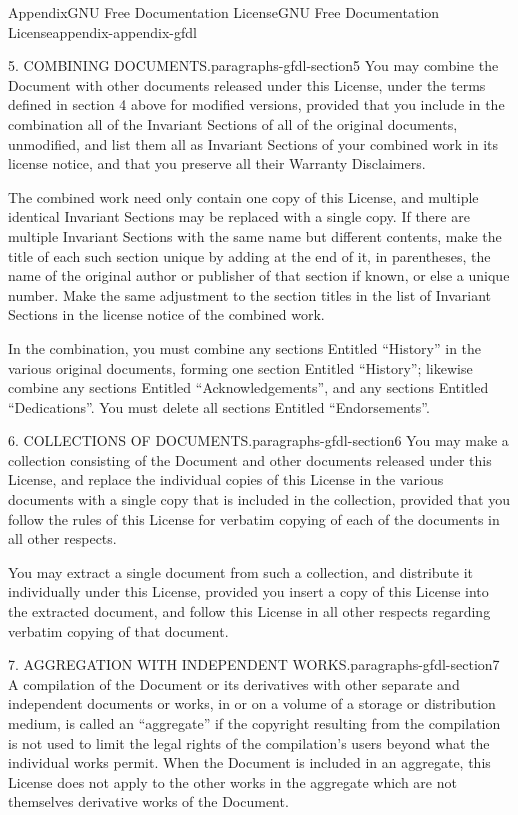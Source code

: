 \documentclass[twoside,10pt,]{book}
\numberwithin{equation}{part}
\begin{document}
\begin{appendixptx}{Appendix}{GNU Free Documentation License}{}{GNU Free Documentation License}{}{}{appendix-appendix-gfdl}
\begin{paragraphs}{5. COMBINING DOCUMENTS.}{paragraphs-gfdl-section5}%
You may combine the Document with other documents released under this License, under the terms defined in section 4 above for modified versions, provided that you include in the combination all of the Invariant Sections of all of the original documents, unmodified, and list them all as Invariant Sections of your combined work in its license notice, and that you preserve all their Warranty Disclaimers.%
\par
The combined work need only contain one copy of this License, and multiple identical Invariant Sections may be replaced with a single copy. If there are multiple Invariant Sections with the same name but different contents, make the title of each such section unique by adding at the end of it, in parentheses, the name of the original author or publisher of that section if known, or else a unique number. Make the same adjustment to the section titles in the list of Invariant Sections in the license notice of the combined work.%
\par
In the combination, you must combine any sections Entitled ``History'' in the various original documents, forming one section Entitled ``History''; likewise combine any sections Entitled ``Acknowledgements'', and any sections Entitled ``Dedications''. You must delete all sections Entitled ``Endorsements''.%
\end{paragraphs}%
\begin{paragraphs}{6. COLLECTIONS OF DOCUMENTS.}{paragraphs-gfdl-section6}%
You may make a collection consisting of the Document and other documents released under this License, and replace the individual copies of this License in the various documents with a single copy that is included in the collection, provided that you follow the rules of this License for verbatim copying of each of the documents in all other respects.%
\par
You may extract a single document from such a collection, and distribute it individually under this License, provided you insert a copy of this License into the extracted document, and follow this License in all other respects regarding verbatim copying of that document.%
\end{paragraphs}%
\begin{paragraphs}{7. AGGREGATION WITH INDEPENDENT WORKS.}{paragraphs-gfdl-section7}%
A compilation of the Document or its derivatives with other separate and independent documents or works, in or on a volume of a storage or distribution medium, is called an ``aggregate'' if the copyright resulting from the compilation is not used to limit the legal rights of the compilation's users beyond what the individual works permit. When the Document is included in an aggregate, this License does not apply to the other works in the aggregate which are not themselves derivative works of the Document.%

\end{paragraphs}
\end{appendixptx}
\end{document}
